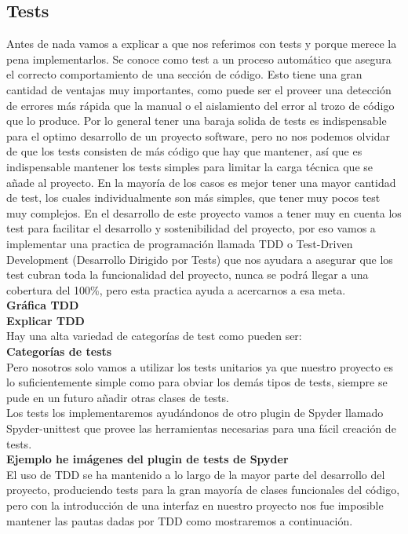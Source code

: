 \documentclass[12pt,a4paper]{article}
\begin{document}
	\subsection{Tests}
	Antes de nada vamos a explicar a que nos referimos con tests y porque merece la pena implementarlos. Se conoce como test a un proceso automático que asegura el correcto comportamiento de una sección de código. Esto tiene una gran cantidad de ventajas muy importantes, como puede ser el proveer una detección de errores más rápida que la manual o el aislamiento del error al trozo de código que lo produce. Por lo general tener una baraja solida de tests es indispensable para el optimo desarrollo de un proyecto software, pero no nos podemos olvidar de que los tests consisten de más código que hay que mantener, así que es indispensable mantener los tests simples para limitar la carga técnica que se añade al proyecto. En la mayoría de los casos es mejor tener una mayor cantidad de test, los cuales individualmente son más simples, que tener muy pocos test muy complejos.
	En el desarrollo de este proyecto vamos a tener muy en cuenta los test para facilitar el desarrollo y sostenibilidad del proyecto, por eso vamos a implementar una practica de programación llamada TDD o Test-Driven Development (Desarrollo Dirigido por Tests) que nos ayudara a asegurar que los test cubran toda la funcionalidad del proyecto, nunca se podrá llegar a una cobertura del 100\%, pero esta practica ayuda a acercarnos a esa meta.\\
	 \textbf{Gráfica TDD}\\
	 \textbf{Explicar TDD}\\
	 Hay una alta variedad de categorías de test como pueden ser:\\
	 \textbf{Categorías de tests}\\
	 Pero nosotros solo vamos a utilizar los tests unitarios ya que nuestro proyecto es lo suficientemente simple como para obviar los demás tipos de tests, siempre se pude en un futuro añadir otras clases de tests.\\
	 Los tests los implementaremos ayudándonos de otro plugin de Spyder llamado Spyder-unittest que provee las herramientas necesarias para una fácil creación de tests.\\
	 \textbf{Ejemplo he imágenes del plugin de tests de Spyder}\\
	 El uso de TDD se ha mantenido a lo largo de la mayor parte del desarrollo del proyecto, produciendo tests para la gran mayoría de clases funcionales del código, pero con la introducción de una interfaz en nuestro proyecto nos fue imposible mantener las pautas dadas por TDD como mostraremos a continuación.\\
	 
\end{document}

